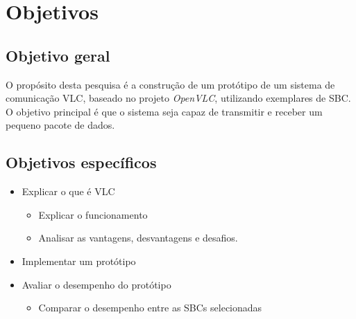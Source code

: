 \chapter{Objetivos} \label{obj}
\section{Objetivo geral}

O propósito desta pesquisa é a construção de um protótipo de um sistema de
comunicação VLC, baseado no projeto \textit{OpenVLC}, utilizando exemplares de SBC. O objetivo principal é que o sistema seja capaz de transmitir e receber um pequeno pacote de dados.

\section{Objetivos específicos}

\begin{itemize}

  \item Explicar o que é VLC
    \begin{itemize}
      \item Explicar o funcionamento
      \item Analisar as vantagens, desvantagens e desafios.
    \end{itemize}

  \item Implementar um protótipo
  \item Avaliar o desempenho do protótipo
    \begin{itemize}
      \item Comparar o desempenho entre as SBCs selecionadas
    \end{itemize}

\end{itemize}

